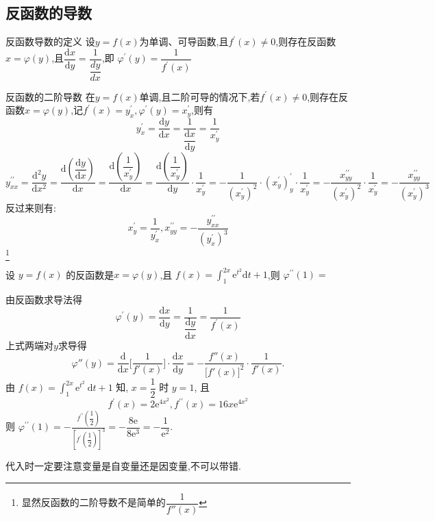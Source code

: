 \documentclass[8pt a4paper, oneside, UTF8]{ctexbook}  %
\begin{document}
\begin{sloppypar}
    \subsection{反函数的导数}
    \begin{defn}{反函数导数的定义}{}
        设$y=f(x)$为单调、可导函数,且$f^{\prime}(x)\neq0$,则存在反函数$x=\varphi(y)$,且$\dfrac{\mathrm{d}x}{\mathrm{d}y}=\dfrac{1}{\dfrac{dy}{dx}}$,即 $\varphi^{\prime}(y)=\dfrac1{f^{\prime}(x)}$
    \end{defn}
    \begin{criterion}{反函数的二阶导数}{}
        在$y=f(x)$单调,且二阶可导的情况下,若$f^{\prime}(x)\neq0$,则存在反函数$x=\varphi(y)$,记$f^{\prime}(x)=y_x^{\prime},\varphi^{\prime}\left(y\right)=x_{y}^{\prime}$,则有
        $$
            y_{x}^{\prime}=\dfrac{\mathrm{d}y}{\mathrm{d}x}=\dfrac{1}{\dfrac{\mathrm{d}x}{\mathrm{d}y}}=\frac{1}{x_{y}^{\prime}}
        $$
        $$
            y_{xx}^{\prime\prime}=\dfrac{\mathrm{d}^{2}y}{\mathrm{d}x^{2}}=\dfrac{\mathrm{d}\left(\dfrac{\mathrm{d}y}{\mathrm{d}x}\right)}{\mathrm{d}x}=\dfrac{\mathrm{d}\left(\dfrac{1}{x_{y}^{\prime}}\right)}{\mathrm{d}x}=\dfrac{\mathrm{d}\left(\dfrac{1}{x_{y}^{\prime}}\right)}{\mathrm{d}y}\cdot\dfrac{1}{x_{y}^{\prime}}=-\dfrac{1}{(x_{y}^{\prime})^{2}}\cdot(x_{y}^{\prime})_{y}^{\prime}\cdot\dfrac{1}{x_{y}^{\prime}}=-\dfrac{x_{yy}^{\prime\prime}}{(x_{y}^{\prime})^{2}}\cdot\dfrac{1}{x_{y}^{\prime}}=-\dfrac{x_{yy}^{\prime\prime}}{(x_{y}^{\prime})^{3}}
        $$
        反过来则有:
        $$
            x_{y}^{\prime}=\dfrac{1}{y_{x}^{\prime}},x_{yy}^{\prime\prime}=-\dfrac{y_{xx}^{\prime\prime}}{(y_{x}^{\prime})^{3}}
        $$\footnote{显然反函数的二阶导数不是简单的$\dfrac{1}{f''(x)}$}
    \end{criterion}
    \begin{problem}
        设 $y=f(x)$ 的反函数是$x=\varphi(y)$,且 $f(x)=\int_1^{2x}\mathrm{e}^{t^2}\mathrm{d}t+1$,则 $\varphi^{\prime\prime}(1)=$
    \end{problem}
    \begin{solution}
        由反函数求导法得
        $$
            \varphi^{'}(y)=\frac{\mathrm{d}x}{\mathrm{d}y}=\dfrac{1}{\dfrac{\mathrm{d}y}{\mathrm{d}x}}=\frac{1}{f^{'}(x)}
        $$
        上式两端对$y$求导得
        $$
            \varphi''(y)=\frac{\mathrm{d}}{\mathrm{d}x}\biggl[\frac{1}{f'(x)}\biggr]\cdot\frac{\mathrm{d}x}{\mathrm{d}y}=-\frac{f''(x)}{\bigl[f'(x)\bigr]^2}\cdot\frac{1}{f'(x)}.
        $$
        由 $f(x)=\int_1^{2 x} \mathrm{e}^{t^2} \mathrm{~d} t+1$ 知, $x=\dfrac{1}{2}$ 时 $y=1$, 且
        $$
            f^{\prime}(x)=2 \mathrm{e}^{4 x^2}, f^{\prime \prime}(x)=16 x \mathrm{e}^{4 x^2}
        $$
        则 $\varphi^{\prime \prime}(1)=-\frac{f^{\prime \prime}\left(\dfrac{1}{2}\right)}{\left[f^{\prime}\left(\dfrac{1}{2}\right)\right]^3}=-\dfrac{8 \mathrm{e}}{8 \mathrm{e}^3}=-\dfrac{1}{\mathrm{e}^2}$.
    \end{solution}
    \begin{note}
        代入时一定要注意变量是自变量还是因变量,不可以带错.    
    \end{note}

\end{sloppypar}
\end{document}
